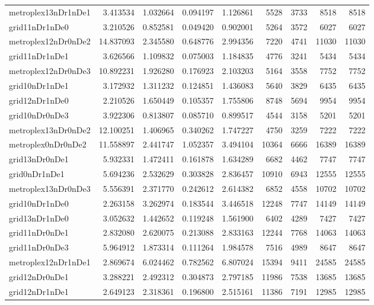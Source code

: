 \begin{longtable}{|l|r|r|r|r|r|r|r|r|}
metroplex13nDr1nDe1 & 3.413534 & 1.032664 & 0.094197 & 1.126861 & 5528 & 3733 & 8518 & 8518 \\
grid11nDr1nDe0 & 3.210526 & 0.852581 & 0.049420 & 0.902001 & 5264 & 3572 & 6027 & 6027 \\
metroplex12nDr0nDe2 & 14.837093 & 2.345580 & 0.648776 & 2.994356 & 7220 & 4741 & 11030 & 11030 \\
grid11nDr1nDe1 & 3.626566 & 1.109832 & 0.075003 & 1.184835 & 4776 & 3241 & 5434 & 5434 \\
metroplex12nDr0nDe3 & 10.892231 & 1.926280 & 0.176923 & 2.103203 & 5164 & 3558 & 7752 & 7752 \\
grid10nDr1nDe1 & 3.172932 & 1.311232 & 0.124851 & 1.436083 & 5640 & 3829 & 6435 & 6435 \\
grid12nDr1nDe0 & 2.210526 & 1.650449 & 0.105357 & 1.755806 & 8748 & 5694 & 9954 & 9954 \\
grid10nDr0nDe3 & 3.922306 & 0.813807 & 0.085710 & 0.899517 & 4544 & 3158 & 5201 & 5201 \\
metroplex13nDr0nDe2 & 12.100251 & 1.406965 & 0.340262 & 1.747227 & 4750 & 3259 & 7222 & 7222 \\
metroplex0nDr0nDe2 & 11.558897 & 2.441747 & 1.052357 & 3.494104 & 10364 & 6666 & 16389 & 16389 \\
grid13nDr0nDe1 & 5.932331 & 1.472411 & 0.161878 & 1.634289 & 6682 & 4462 & 7747 & 7747 \\
grid0nDr1nDe1 & 5.694236 & 2.532629 & 0.303828 & 2.836457 & 10910 & 6943 & 12555 & 12555 \\
metroplex13nDr0nDe3 & 5.556391 & 2.371770 & 0.242612 & 2.614382 & 6852 & 4558 & 10702 & 10702 \\
grid10nDr1nDe0 & 2.263158 & 3.262974 & 0.183544 & 3.446518 & 12248 & 7747 & 14149 & 14149 \\
grid13nDr1nDe0 & 3.052632 & 1.442652 & 0.119248 & 1.561900 & 6402 & 4289 & 7427 & 7427 \\
grid11nDr0nDe1 & 2.832080 & 2.620075 & 0.213088 & 2.833163 & 12244 & 7768 & 14063 & 14063 \\
grid11nDr0nDe3 & 5.964912 & 1.873314 & 0.111264 & 1.984578 & 7516 & 4989 & 8647 & 8647 \\
metroplex12nDr1nDe1 & 2.869674 & 6.024462 & 0.782562 & 6.807024 & 15394 & 9411 & 24585 & 24585 \\
grid12nDr0nDe1 & 3.288221 & 2.492312 & 0.304873 & 2.797185 & 11986 & 7538 & 13685 & 13685 \\
grid12nDr1nDe1 & 2.649123 & 2.318361 & 0.196800 & 2.515161 & 11386 & 7191 & 12985 & 12985 \\

\end{longtable}
